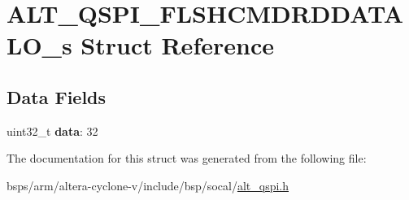 \hypertarget{structALT__QSPI__FLSHCMDRDDATALO__s}{}\section{A\+L\+T\+\_\+\+Q\+S\+P\+I\+\_\+\+F\+L\+S\+H\+C\+M\+D\+R\+D\+D\+A\+T\+A\+L\+O\+\_\+s Struct Reference}
\label{structALT__QSPI__FLSHCMDRDDATALO__s}
\subsection*{Data Fields}
\begin{DoxyCompactItemize}
\item 
\mbox{\label{structALT__QSPI__FLSHCMDRDDATALO__s_a57a3cfed8e0d8e3ee6aacdefb6d8d83f}} 
uint32\+\_\+t {\bfseries data}\+: 32
\end{DoxyCompactItemize}


The documentation for this struct was generated from the following file\+:\begin{DoxyCompactItemize}
\item 
bsps/arm/altera-\/cyclone-\/v/include/bsp/socal/\mbox{\hyperlink{include_2bsp_2socal_2alt__qspi_8h}{alt\+\_\+qspi.\+h}}\end{DoxyCompactItemize}
